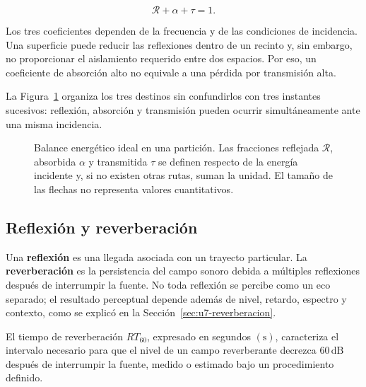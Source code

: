 
\begin{equation}
    \mathcal{R}+\alpha+\tau=1.
    \label{eq:u9-balance-superficie}
\end{equation}

Los tres coeficientes dependen de la frecuencia y de las condiciones de
incidencia. Una superficie puede reducir las reflexiones dentro de un recinto
y, sin embargo, no proporcionar el aislamiento requerido entre dos espacios.
Por eso, un coeficiente de absorción alto no equivale a una pérdida por
transmisión alta.

La Figura~\ref{fig:u9-balance-superficie} organiza los tres destinos sin
confundirlos con tres instantes sucesivos: reflexión, absorción y transmisión
pueden ocurrir simultáneamente ante una misma incidencia.

\begin{figure}[htbp]
    \centering
    
    \caption{Balance energético ideal en una partición. Las fracciones
    reflejada \(\mathcal{R}\), absorbida \(\alpha\) y transmitida \(\tau\)
    se definen respecto de la energía incidente y, si no existen otras rutas,
    suman la unidad. El tamaño de las flechas no representa valores
    cuantitativos.}
    \label{fig:u9-balance-superficie}
\end{figure}

\subsection{Reflexión y reverberación}
\label{sec:u9-reverberacion}

Una \textbf{reflexión} es una llegada asociada con un trayecto particular. La
\textbf{reverberación} es la persistencia del campo sonoro debida a múltiples
reflexiones después de interrumpir la fuente. No toda reflexión se percibe
como un eco separado; el resultado perceptual depende además de nivel, retardo,
espectro y contexto, como se explicó en la
Sección~\ref{sec:u7-reverberacion}.

El tiempo de reverberación \(RT_{60}\), expresado en segundos
\((\text{s})\), caracteriza el intervalo necesario para que el nivel de un
campo reverberante decrezca \(60\,\text{dB}\) después de interrumpir la fuente,
medido o estimado bajo un procedimiento definido.



